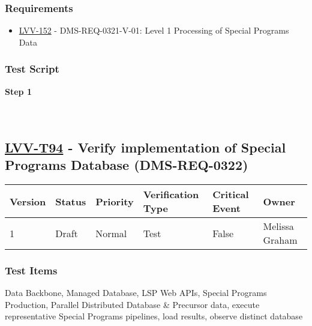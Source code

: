 \hypertarget{requirements-183}{%
\subsubsection{Requirements}\label{requirements-183}}

\begin{itemize}
\tightlist
\item
  \href{https://jira.lsstcorp.org/browse/LVV-152}{LVV-152} -
  DMS-REQ-0321-V-01: Level 1 Processing of Special Programs Data
\end{itemize}

\hypertarget{test-script-183}{%
\subsubsection{Test Script}\label{test-script-183}}

\textbf{Step 1}\\
~\\
~\\

\hypertarget{lvv-t94---verify-implementation-of-special-programs-database-dms-req-0322}{%
\subsection{\texorpdfstring{\href{https://jira.lsstcorp.org/secure/Tests.jspa\#/testCase/LVV-T94}{LVV-T94}
- Verify implementation of Special Programs Database
(DMS-REQ-0322)}{LVV-T94 - Verify implementation of Special Programs Database (DMS-REQ-0322)}}\label{lvv-t94---verify-implementation-of-special-programs-database-dms-req-0322}}

\begin{longtable}[]{@{}llllll@{}}
\toprule
Version & Status & Priority & Verification Type & Critical Event &
Owner\tabularnewline
\midrule
\endhead
1 & Draft & Normal & Test & False & Melissa Graham\tabularnewline
\bottomrule
\end{longtable}

\hypertarget{test-items-183}{%
\subsubsection{Test Items}\label{test-items-183}}

Data Backbone, Managed Database, LSP Web APIs, Special Programs
Production, Parallel Distributed Database \& Precursor data, execute
representative Special Programs pipelines, load results, observe
distinct database

